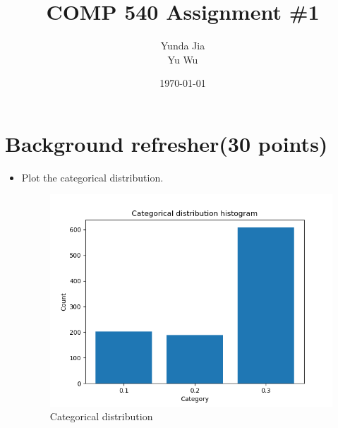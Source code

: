 \documentclass{article}
\title{COMP 540 Assignment \#1}
\author{Yunda Jia\\Yu Wu}
\date{\today}
\begin{document}
\maketitle

\section{Background refresher(30 points)}
\begin{itemize}
	\item Plot the categorical distribution.\\
\begin{figure}[htbp]
	\centering
	\includegraphics[scale = 0.5]{Categorical_distribution.png}
	\caption{Categorical distribution}
\end{figure}


\end{itemize}
\end{document}

